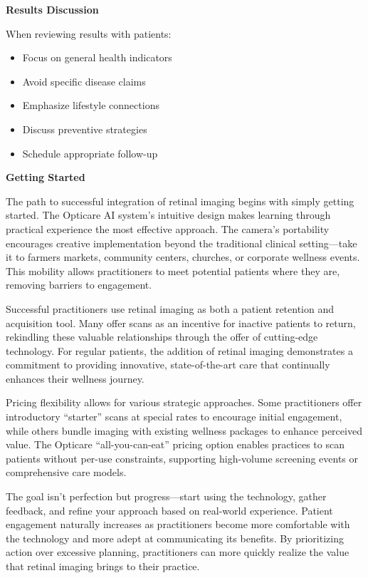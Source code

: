 \documentclass[
  Letterpaper,
]{scrbook}
\providecommand{\tightlist}{%
  \setlength{\itemsep}{0pt}\setlength{\parskip}{0pt}}\usepackage{longtable,booktabs,array}
\begin{document}
\textbf{Results Discussion}

When reviewing results with patients:

\begin{itemize}
\tightlist
\item
  Focus on general health indicators
\item
  Avoid specific disease claims
\item
  Emphasize lifestyle connections
\item
  Discuss preventive strategies
\item
  Schedule appropriate follow-up
\end{itemize}

\textbf{Getting Started}

The path to successful integration of retinal imaging begins with simply
getting started. The Opticare AI system's intuitive design makes
learning through practical experience the most effective approach. The
camera's portability encourages creative implementation beyond the
traditional clinical setting---take it to farmers markets, community
centers, churches, or corporate wellness events. This mobility allows
practitioners to meet potential patients where they are, removing
barriers to engagement.

Successful practitioners use retinal imaging as both a patient retention
and acquisition tool. Many offer scans as an incentive for inactive
patients to return, rekindling these valuable relationships through the
offer of cutting-edge technology. For regular patients, the addition of
retinal imaging demonstrates a commitment to providing innovative,
state-of-the-art care that continually enhances their wellness journey.

Pricing flexibility allows for various strategic approaches. Some
practitioners offer introductory ``starter'' scans at special rates to
encourage initial engagement, while others bundle imaging with existing
wellness packages to enhance perceived value. The Opticare
``all-you-can-eat'' pricing option enables practices to scan patients
without per-use constraints, supporting high-volume screening events or
comprehensive care models.

The goal isn't perfection but progress---start using the technology,
gather feedback, and refine your approach based on real-world
experience. Patient engagement naturally increases as practitioners
become more comfortable with the technology and more adept at
communicating its benefits. By prioritizing action over excessive
planning, practitioners can more quickly realize the value that retinal
imaging brings to their practice.
\end{document}
